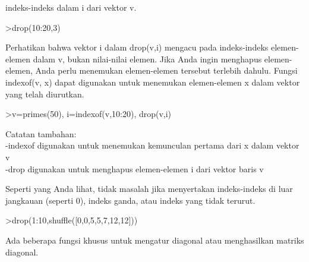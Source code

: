 \documentclass[12pt,arial,letterpaper]{book}
\begin{document}
\begin{eulercomment}
\begin{eulercomment}
\begin{eulercomment}
\begin{eulercomment}
\begin{eulercomment}
indeks-indeks dalam i dari vektor v.
\end{eulercomment}
\begin{eulerprompt}
>drop(10:20,3)
\end{eulerprompt}
\begin{euleroutput}
  [10,  11,  13,  14,  15,  16,  17,  18,  19,  20]
\end{euleroutput}
\begin{eulercomment}
Perhatikan bahwa vektor i dalam drop(v,i) mengacu pada indeks-indeks
elemen-elemen dalam v, bukan nilai-nilai elemen. Jika Anda ingin
menghapus elemen-elemen, Anda perlu menemukan elemen-elemen tersebut
terlebih dahulu. Fungsi indexof(v, x) dapat digunakan untuk menemukan
elemen-elemen x dalam vektor yang telah diurutkan.
\end{eulercomment}
\begin{eulerprompt}
>v=primes(50), i=indexof(v,10:20), drop(v,i)
\end{eulerprompt}
\begin{euleroutput}
  [2,  3,  5,  7,  11,  13,  17,  19,  23,  29,  31,  37,  41,  43,  47]
  [0,  5,  0,  6,  0,  0,  0,  7,  0,  8,  0]
  [2,  3,  5,  7,  23,  29,  31,  37,  41,  43,  47]
\end{euleroutput}
\begin{eulercomment}
Catatan tambahan:\\
-indexof digunakan untuk menemukan kemunculan pertama dari x dalam
vektor v\\
-drop digunakan untuk menghapus elemen-elemen i dari vektor baris v

Seperti yang Anda lihat, tidak masalah jika menyertakan indeks-indeks
di luar jangkauan (seperti 0), indeks ganda, atau indeks yang tidak
terurut.
\end{eulercomment}
\begin{eulerprompt}
>drop(1:10,shuffle([0,0,5,5,7,12,12]))
\end{eulerprompt}
\begin{euleroutput}
  [1,  2,  3,  4,  6,  8,  9,  10]
\end{euleroutput}
\begin{eulercomment}
Ada beberapa fungsi khusus untuk mengatur diagonal atau menghasilkan
matriks diagonal.


\end{eulercomment}
\end{eulercomment}
\end{eulercomment}
\end{eulercomment}
\end{eulercomment}
\end{document}
